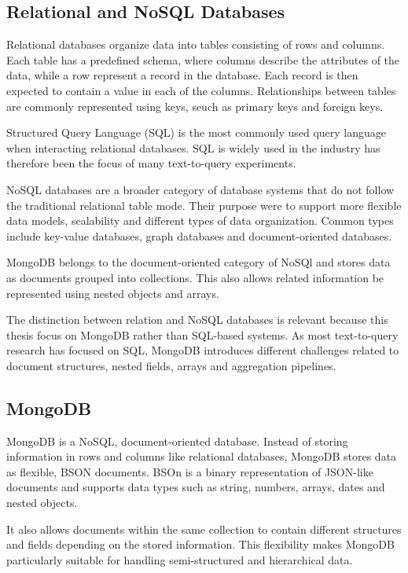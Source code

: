 \subsection{Relational and NoSQL Databases}

Relational databases organize data into tables consisting of rows and columns. Each table has a predefined schema, where columns describe the attributes of the data, while a row represent a record in the database. Each record is then expected to contain a value in each of the columns. Relationships between tables are commonly represented using keys, seuch as primary keys and foreign keys. 

Structured Query Language (SQL) is the most commonly used query language when interacting relational databases. SQL is widely used in the industry has therefore been the focus of many text-to-query experiments. 

NoSQL databases are a broader category of database systems that do not follow the traditional relational table mode. Their purpose were to support more flexible data models, scalability and different types of data organization. Common types include key-value databases, graph databases and document-oriented databases. 

MongoDB belongs to the document-oriented category of NoSQl and stores data as documents grouped into collections. This also allows related information be represented using nested objects and arrays.

The distinction between relation and NoSQL databases is relevant because this thesis focus on MongoDB rather than SQL-based systems. As most text-to-query research has focused on SQL, MongoDB introduces different challenges related to document structures, nested fields, arrays and aggregation pipelines. 

\subsection{MongoDB}

MongoDB is a NoSQL, document-oriented database. Instead of storing information in rows and columns like relational databases, MongoDB stores data as flexible, BSON documents. BSOn is a binary representation of JSON-like documents and supports data types such as string, numbers, arrays, dates and nested objects. 

It also allows documents within the same collection to contain different structures and fields depending on the stored information. This flexibility makes MongoDB particularly suitable for handling semi-structured and hierarchical data. 


